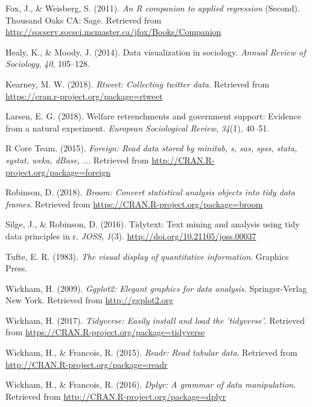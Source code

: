 \documentclass[12pt,oneside]{reedthesis}
\theoremstyle{definition}
\theoremstyle{definition}
\theoremstyle{definition}
\theoremstyle{remark}
\begin{document}
  \hypertarget{ref-foxweisberg2011}{}
  Fox, J., \& Weisberg, S. (2011). \emph{An R companion to applied
  regression} (Second). Thousand Oaks CA: Sage. Retrieved from
  \url{http://socserv.socsci.mcmaster.ca/jfox/Books/Companion}
  
  \hypertarget{ref-healymoody2014}{}
  Healy, K., \& Moody, J. (2014). Data visualization in sociology.
  \emph{Annual Review of Sociology}, \emph{40}, 105--128.
  
  \hypertarget{ref-rtweet-package}{}
  Kearney, M. W. (2018). \emph{Rtweet: Collecting twitter data}. Retrieved
  from \url{https://cran.r-project.org/package=rtweet}
  
  \hypertarget{ref-larsen2018}{}
  Larsen, E. G. (2018). Welfare retrenchments and government support:
  Evidence from a natural experiment. \emph{European Sociological Review},
  \emph{34}(1), 40--51.
  
  \hypertarget{ref-rcoreteam2015foreign}{}
  R Core Team. (2015). \emph{Foreign: Read data stored by minitab, s, sas,
  spss, stata, systat, weka, dBase, ...} Retrieved from
  \url{http://CRAN.R-project.org/package=foreign}
  
  \hypertarget{ref-Robinson2018}{}
  Robinson, D. (2018). \emph{Broom: Convert statistical analysis objects
  into tidy data frames}. Retrieved from
  \url{https://CRAN.R-project.org/package=broom}
  
  \hypertarget{ref-tidytext2016}{}
  Silge, J., \& Robinson, D. (2016). Tidytext: Text mining and analysis
  using tidy data principles in r. \emph{JOSS}, \emph{1}(3).
  \url{http://doi.org/10.21105/joss.00037}
  
  \hypertarget{ref-tufte1983}{}
  Tufte, E. R. (1983). \emph{The visual display of quantitative
  information}. Graphics Press.
  
  \hypertarget{ref-wickham2009}{}
  Wickham, H. (2009). \emph{Ggplot2: Elegant graphics for data analysis}.
  Springer-Verlag New York. Retrieved from \url{http://ggplot2.org}
  
  \hypertarget{ref-wickham2017}{}
  Wickham, H. (2017). \emph{Tidyverse: Easily install and load the
  'tidyverse'}. Retrieved from
  \url{https://CRAN.R-project.org/package=tidyverse}
  
  \hypertarget{ref-wickhamfrancois2015}{}
  Wickham, H., \& Francois, R. (2015). \emph{Readr: Read tabular data}.
  Retrieved from \url{http://CRAN.R-project.org/package=readr}
  
  \hypertarget{ref-wickhamfrancois2016}{}
  Wickham, H., \& Francois, R. (2016). \emph{Dplyr: A grammar of data
  manipulation}. Retrieved from
  \url{http://CRAN.R-project.org/package=dplyr}


\end{document}
